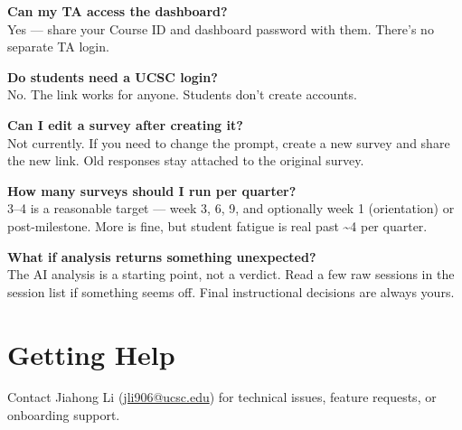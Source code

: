 \documentclass[11pt, letterpaper]{article}
\begin{document}
\textbf{Can my TA access the dashboard?}\\
Yes --- share your Course ID and dashboard password with them. There's no separate TA login.

\textbf{Do students need a UCSC login?}\\
No. The link works for anyone. Students don't create accounts.

\textbf{Can I edit a survey after creating it?}\\
Not currently. If you need to change the prompt, create a new survey and share the new link. Old responses stay attached to the original survey.

\textbf{How many surveys should I run per quarter?}\\
3--4 is a reasonable target --- week 3, 6, 9, and optionally week 1 (orientation) or post-milestone. More is fine, but student fatigue is real past \textasciitilde4 per quarter.

\textbf{What if analysis returns something unexpected?}\\
The AI analysis is a starting point, not a verdict. Read a few raw sessions in the session list if something seems off. Final instructional decisions are always yours.

\section{Getting Help}

Contact Jiahong Li (\href{mailto:jli906@ucsc.edu}{jli906@ucsc.edu}) for technical issues, feature requests, or onboarding support.
\end{document}
